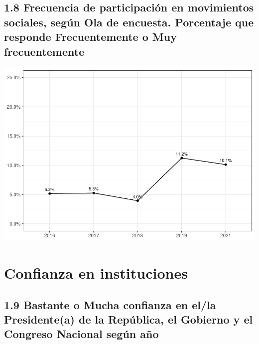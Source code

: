 \documentclass[
  12pt,
]{book}
\begin{document}
\hypertarget{frecuencia-de-participaciuxf3n-en-movimientos-sociales-seguxfan-ola-de-encuesta.-porcentaje-que-responde-frecuentemente-o-muy-frecuentemente}{%
\subsection{1.8 Frecuencia de participación en movimientos sociales, según Ola de encuesta. Porcentaje que responde Frecuentemente o Muy frecuentemente}\label{frecuencia-de-participaciuxf3n-en-movimientos-sociales-seguxfan-ola-de-encuesta.-porcentaje-que-responde-frecuentemente-o-muy-frecuentemente}}

\includegraphics{reporte-elsoc_files/figure-latex/unnamed-chunk-13-1.pdf}

\hypertarget{confianza-en-instituciones}{%
\section{Confianza en instituciones}\label{confianza-en-instituciones}}

\hypertarget{bastante-o-mucha-confianza-en-ella-presidentea-de-la-repuxfablica-el-gobierno-y-el-congreso-nacional-seguxfan-auxf1o}{%
\subsection{1.9 Bastante o Mucha confianza en el/la Presidente(a) de la República, el Gobierno y el Congreso Nacional según año}\label{bastante-o-mucha-confianza-en-ella-presidentea-de-la-repuxfablica-el-gobierno-y-el-congreso-nacional-seguxfan-auxf1o}}
\end{document}
